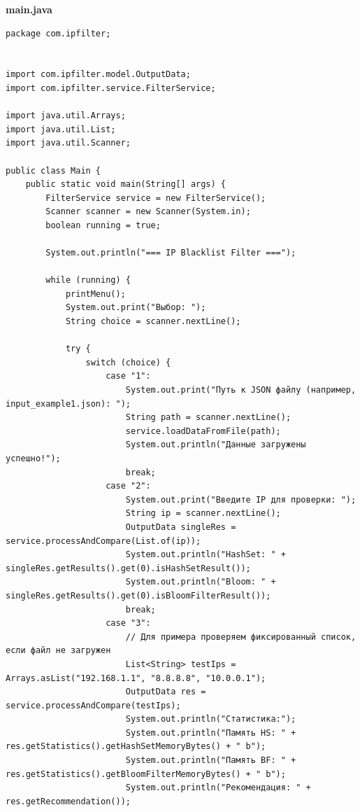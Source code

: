 \noindent \textbf{main.java}
\begin{verbatim}
package com.ipfilter;


import com.ipfilter.model.OutputData;
import com.ipfilter.service.FilterService;

import java.util.Arrays;
import java.util.List;
import java.util.Scanner;

public class Main {
    public static void main(String[] args) {
        FilterService service = new FilterService();
        Scanner scanner = new Scanner(System.in);
        boolean running = true;

        System.out.println("=== IP Blacklist Filter ===");

        while (running) {
            printMenu();
            System.out.print("Выбор: ");
            String choice = scanner.nextLine();

            try {
                switch (choice) {
                    case "1":
                        System.out.print("Путь к JSON файлу (например, input_example1.json): ");
                        String path = scanner.nextLine();
                        service.loadDataFromFile(path);
                        System.out.println("Данные загружены успешно!");
                        break;
                    case "2":
                        System.out.print("Введите IP для проверки: ");
                        String ip = scanner.nextLine();
                        OutputData singleRes = service.processAndCompare(List.of(ip));
                        System.out.println("HashSet: " + singleRes.getResults().get(0).isHashSetResult());
                        System.out.println("Bloom: " + singleRes.getResults().get(0).isBloomFilterResult());
                        break;
                    case "3":
                        // Для примера проверяем фиксированный список, если файл не загружен
                        List<String> testIps = Arrays.asList("192.168.1.1", "8.8.8.8", "10.0.0.1");
                        OutputData res = service.processAndCompare(testIps);
                        System.out.println("Статистика:");
                        System.out.println("Память HS: " + res.getStatistics().getHashSetMemoryBytes() + " b");
                        System.out.println("Память BF: " + res.getStatistics().getBloomFilterMemoryBytes() + " b");
                        System.out.println("Рекомендация: " + res.getRecommendation());


\end{verbatim}
